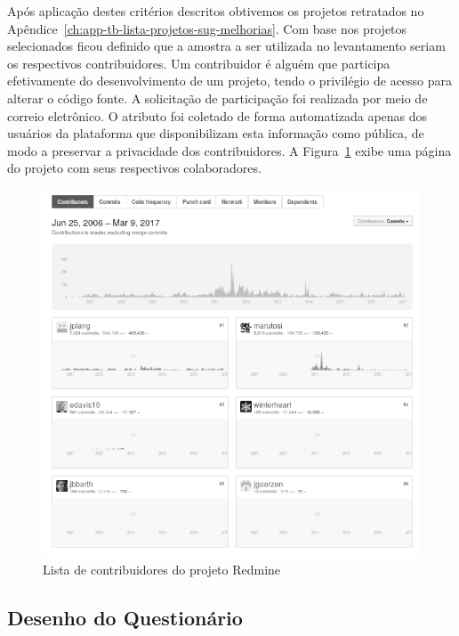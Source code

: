 Após aplicação destes critérios descritos obtivemos os projetos retratados no
Apêndice~\ref{ch:app-tb-lista-projetos-sug-melhorias}. Com base nos projetos
selecionados ficou definido que a amostra a ser utilizada no levantamento
seriam os respectivos contribuidores. Um contribuidor é alguém que participa
efetivamente do desenvolvimento de um projeto, tendo o privilégio de acesso
para alterar o código fonte. A solicitação de participação foi realizada por
meio de correio eletrônico. O atributo foi coletado de forma automatizada
apenas dos usuários da plataforma que disponibilizam esta informação como
pública, de modo a preservar a privacidade dos contribuidores. A
Figura~\ref{fig:redmine_contribuidores} exibe uma página do projeto com seus
respectivos colaboradores.

\begin{figure}[htpb]
	\centering
	\includegraphics[width=0.8\linewidth]{./chapter-sugestoes-melhorias-fgrm/img/redmine_contribuidores.png}
	\caption{Lista de contribuidores do projeto Redmine}
\label{fig:redmine_contribuidores}
\end{figure}

\subsection{Desenho do Questionário}
\label{ssub:sug_melhoria_desenho_questionario}

